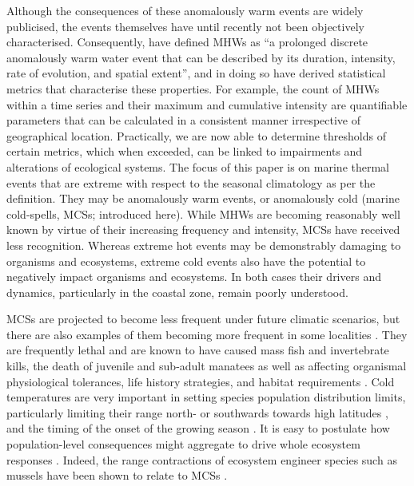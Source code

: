 \documentclass[a4paper,10pt,review]{elsarticle}
\begin{document}
Although the consequences of these anomalously warm events are widely publicised, the events themselves have until recently not been objectively characterised. Consequently, \citet{Hobday2016} have defined MHWs as ``a prolonged discrete anomalously warm water event that can be described by its duration, intensity, rate of evolution, and spatial extent'', and in doing so have derived statistical metrics that characterise these properties. For example, the count of MHWs within a time series and their maximum and cumulative intensity are quantifiable parameters that can be calculated in a consistent manner irrespective of geographical location. Practically, we are now able to determine thresholds of certain metrics, which when exceeded, can be linked to impairments and alterations of ecological systems. The focus of this paper is on marine thermal events that are extreme with respect to the seasonal climatology as per the \citet{Hobday2016} definition. They may be anomalously warm events, or anomalously cold (marine cold-spells, MCSs; introduced here). While MHWs are becoming reasonably well known by virtue of their increasing frequency and intensity, MCSs have received less recognition. Whereas extreme hot events may be demonstrably damaging to organisms and ecosystems, extreme cold events also have the potential to negatively impact organisms and ecosystems. In both cases their drivers and dynamics, particularly in the coastal zone, remain poorly understood.

MCSs are projected to become less frequent under future climatic scenarios, but there are also examples of them becoming more frequent in some localities \citep[e.g.][]{Gershunov2008, Matthes2015}. They are frequently lethal \citep{Woodward1987} and are known to have caused mass fish \citep{Gunter1941, Gunter1951, Holt1983} and invertebrate \citep{Gunter1951, Crisp1964} kills, the death of juvenile and sub-adult manatees \citep{OShea1985, Marsh1986} as well as affecting organismal physiological tolerances, life history strategies, and habitat requirements \citep{Ellis2015}. Cold temperatures are very important in setting species population distribution limits, particularly limiting their range north- or southwards towards high latitudes \citep{Firth2011}, and the timing of the onset of the growing season \citep{Jentsch2007}. It is easy to postulate how population-level consequences might aggregate to drive whole ecosystem responses \citep[e.g.][]{Kreyling2008, Rehage2016}. Indeed, the range contractions of ecosystem engineer species such as mussels have been shown to relate to MCSs \citep{Firth2011, Firth2015}.
\end{document}
